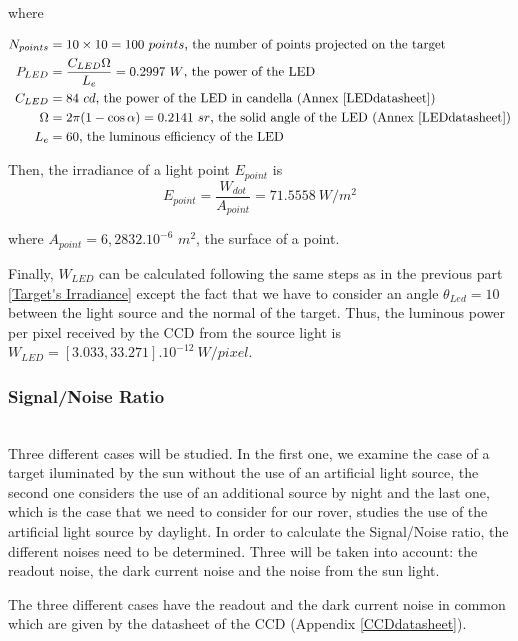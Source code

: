 where

\begin{align*}
N_{points} & = 10\times 10 = 100\ points\mbox{, the number of points projected on the  target}\\
P_{LED} & = \frac{C_{LED}\Omega}{L_e} = 0.2997\ W\mbox{, the power of the LED}\\
C_{LED} & = 84\ cd\mbox{, the power of the LED in candella (Annex \ref{LEDdatasheet})}\\
\Omega & = 2\pi (1-\cos \alpha) = 0.2141\ sr\mbox{, the solid angle of the LED (Annex \ref{LEDdatasheet})}\\
L_e & = 60\mbox{, the luminous efficiency of the LED}
\end{align*}

Then, the irradiance of a light point $E_{point}$ is
\begin{equation}
E_{point} = \frac{W_{dot}}{A_{point}} = 71.5558\ W/m^2
\end{equation}

where $A_{point} = 6,2832.10^{-6}$ $m^2$, the surface of a point.

Finally, $W_{LED}$ can be calculated following the same steps as in the previous part \ref{Target's Irradiance} except the fact that we have to consider an angle $\theta_{Led} = 10$\textdegree $ $ between the light source and the normal of the target. Thus, the luminous power per pixel received by the CCD from the source light is $W_{LED} = [3.033, 33.271].10^{-12}\ W/pixel$.






\subsubsection{Signal/Noise Ratio}
~\\ 
Three different cases will be studied. In the first one, we examine the case of a target iluminated by the sun without the use of an artificial light source, the second one considers the use of an additional source by night and the last one, which is the case that we need to consider for our rover, studies the use of the artificial light source by daylight. In order to calculate the Signal/Noise ratio, the different noises need to be determined. Three will be taken into account: the readout noise, the dark current noise and the noise from the sun light. 

The three different cases have the readout and the dark current noise in common which are given by the datasheet of the CCD (Appendix \ref{CCDdatasheet}).

